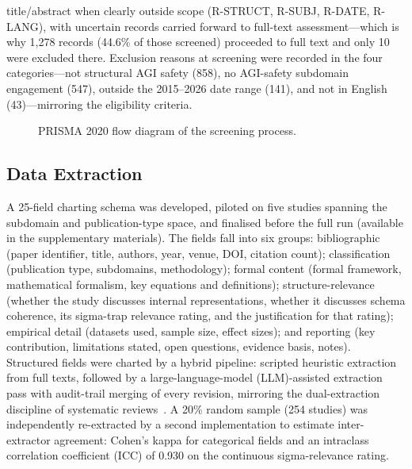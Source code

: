 title/abstract when clearly outside scope (R-STRUCT, R-SUBJ, R-DATE, R-LANG), with uncertain records carried forward to full-text assessment---which is why 1,278 records (44.6\% of those screened) proceeded to full text and only 10 were excluded there. Exclusion reasons at screening were recorded in the four categories---not structural AGI safety (858), no AGI-safety subdomain engagement (547), outside the 2015--2026 date range (141), and not in English (43)---mirroring the eligibility criteria.

\begin{figure}[htbp]
\centering

\caption{PRISMA 2020 flow diagram of the screening process.}
\label{fig:prisma-flow}
\end{figure}

\subsection{Data Extraction}
A 25-field charting schema was developed, piloted on five studies spanning the subdomain and publication-type space, and finalised before the full run (available in the supplementary materials). The fields fall into six groups: bibliographic (paper identifier, title, authors, year, venue, DOI, citation count); classification (publication type, subdomains, methodology); formal content (formal framework, mathematical formalism, key equations and definitions); structure-relevance (whether the study discusses internal representations, whether it discusses schema coherence, its sigma-trap relevance rating, and the justification for that rating); empirical detail (datasets used, sample size, effect sizes); and reporting (key contribution, limitations stated, open questions, evidence basis, notes). Structured fields were charted by a hybrid pipeline: scripted heuristic extraction from full texts, followed by a large-language-model (LLM)-assisted extraction pass with audit-trail merging of every revision, mirroring the dual-extraction discipline of systematic reviews~\cite{whiting2011quadas2}. A 20\% random sample (254 studies) was independently re-extracted by a second implementation to estimate inter-extractor agreement: Cohen's kappa for categorical fields and an intraclass correlation coefficient (ICC) of 0.930 on the continuous sigma-relevance rating.

